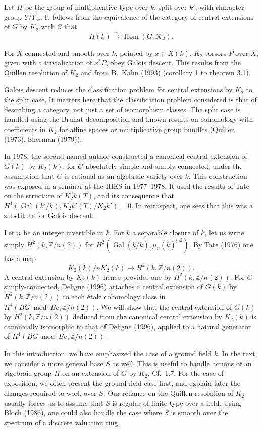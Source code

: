 \documentclass[11pt,a4paper]{article}
\theoremstyle{plain}
\theoremstyle{definition}
\DeclareMathOperator{\Hom}{Hom}
\DeclareMathOperator{\Gal}{Gal}
\newcommand{\cC}{\mathcal{C}}
\newcommand{\cK}{\mathcal{K}}
\newcommand{\bZ}{\mathbb{Z}}
\newcommand{\scu}{\mathrm{sc}}
\begin{document}
Let $H$ be the group of multiplicative type over $k$, split over $k'$, with character group $Y/Y_{\scu}$. It follows from the equivalence of the category of central extensions of $G$ by $K_2$ with $\cC$ that
\[H(k) \xrightarrow{\sim} \Hom(G, \cK_2).\]

For $X$ connected and smooth over $k$, pointed by $x \in X(k)$, $K_2$-torsors $P$ over $X$, given with a trivialization of $x^*P$, obey Galois descent. This results from the Quillen resolution of $K_2$ and from B.~Kahn (1993) (corollary 1 to theorem 3.1).

Galois descent reduces the classification problem for central extensions by $K_2$ to the split case. It matters here that the classification problem considered is that of describing a category, not just a set of isomorphism classes. The split case is handled using the Bruhat decomposition and known results on cohomology with coefficients in $K_2$ for affine spaces or multiplicative group bundles (Quillen (1973), Sherman (1979)).

In 1978, the second named author constructed a canonical central extension of $G(k)$ by $K_2(k)$, for $G$ absolutely simple and simply-connected, under the assumption that $G$ is rational as an algebraic variety over $k$. This construction was exposed in a seminar at the IHES in 1977--1978. It used the results of Tate on the structure of $K_2k(T)$, and its consequence that $H^1(\Gal(k'/k), K_2k'(T)/K_2k') = 0$. In retrospect, one sees that this was a substitute for Galois descent.

Let $n$ be an integer invertible in $k$. For $\bar{k}$ a separable closure of $k$, let us write simply $H^2(k, \bZ/n(2))$ for $H^2(\Gal(\bar{k}/k), \mu_n(\bar{k})^{\otimes 2})$. By Tate (1976) one has a map
\[K_2(k)/nK_2(k) \to H^2(k, \bZ/n(2)).\]
A central extension by $K_2(k)$ hence provides one by $H^2(k, \bZ/n(2))$. For $G$ simply-connected, Deligne (1996) attaches a central extension of $G(k)$ by $H^2(k, \bZ/n(2))$ to each \'etale cohomology class in $H^4(BG \bmod Be, \bZ/n(2))$. We will show that the central extension of $G(k)$ by $H^2(k, \bZ/n(2))$ deduced from the canonical central extension by $K_2(k)$ is canonically isomorphic to that of Deligne (1996), applied to a natural generator of $H^4(BG \bmod Be, \bZ/n(2))$.

In this introduction, we have emphasized the case of a ground field $k$. In the text, we consider a more general base $S$ as well. This is useful to handle actions of an algebraic group $H$ on an extension of $G$ by $K_2$. Cf.~1.7. For the ease of exposition, we often present the ground field case first, and explain later the changes required to work over $S$. Our reliance on the Quillen resolution of $K_2$ usually forces us to assume that $S$ is regular of finite type over a field. Using Bloch (1986), one could also handle the case where $S$ is smooth over the spectrum of a discrete valuation ring.
\end{document}
